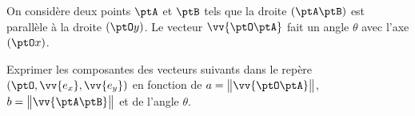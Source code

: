 
\finEntrainement










\hauteurLargeurCadreReponse		{8mm}{5cm}
\initialisationEntrainement


\initialisationPartieGauche %
 On considère deux points $\ptA$ et $\ptB$ tels que la droite  $(\ptA\ptB)$ est parallèle à la droite $(\ptO y)$. Le vecteur $\vv{\ptO \ptA}$  fait un 
 angle $\theta$ avec l'axe $(\ptO x)$.
 
 Exprimer les composantes des vecteurs suivants dans le repère  $(\ptO,\vv{e_x},\vv{e_y})$ en fonction de 
 $a=\big\|\vv{\ptO \ptA}\big\|$, $b=\big\|\vv{\ptA \ptB}\big\|$ et de l'angle $\theta$.

